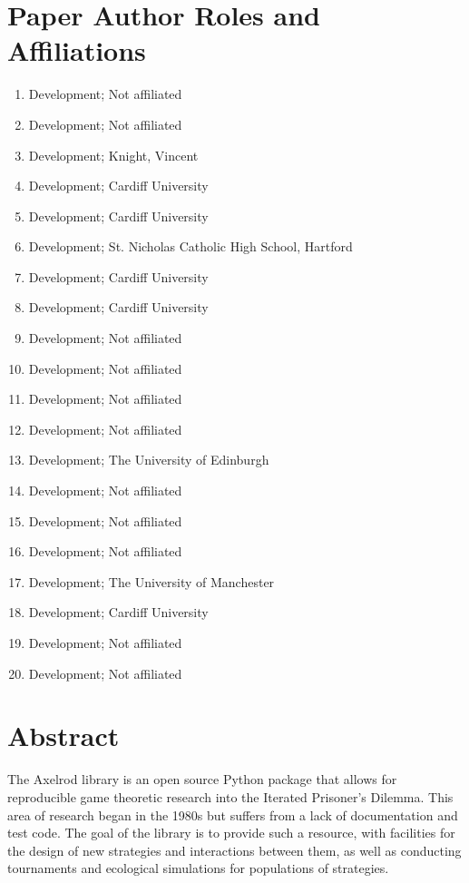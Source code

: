 \documentclass{jors}
\begin{document}
\section*{Paper Author Roles and Affiliations}


\begin{multicols}{2}
    \begin{enumerate}[noitemsep,topsep=0pt]
\item Development; Not affiliated
\item Development; Not affiliated
\item Development; Knight, Vincent
\item Development; Cardiff University
\item Development; Cardiff University
\item Development; St. Nicholas Catholic High School, Hartford
\item Development; Cardiff University
\item Development; Cardiff University
\item Development; Not affiliated
\item Development; Not affiliated
\item Development; Not affiliated
\item Development; Not affiliated
\item Development; The University of Edinburgh
\item Development; Not affiliated
\item Development; Not affiliated
\item Development; Not affiliated
\item Development; The University of Manchester
\item Development; Cardiff University
\item Development; Not affiliated
\item Development; Not affiliated
    \end{enumerate}
\end{multicols}

\section*{Abstract}

The Axelrod library is an open source Python package that allows for
reproducible game theoretic research into the Iterated Prisoner's Dilemma.
This area of research began in the 1980s but suffers from a lack of
documentation and test code. The goal of the library is to provide such
a resource, with facilities for the design of new strategies and
interactions between them, as well as conducting tournaments and ecological
simulations for populations of strategies.
\end{document}
